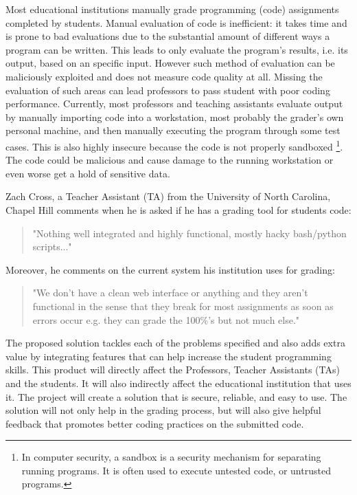 
Most educational institutions manually grade programming (code) assignments
completed by students. Manual evaluation of code is inefficient: it takes time
and is prone to bad evaluations due to the substantial amount of different ways
a program can be written. This leads to only evaluate the program's results,
i.e. its output, based on an specific input. However such method of evaluation
can be maliciously exploited and does not measure code quality at all. Missing
the evaluation of such areas can lead professors to pass student with poor
coding performance. Currently, most professors and teaching assistants evaluate
output by manually importing code into a workstation, most probably the grader's
own personal machine, and then manually executing the program through some test
cases. This is also highly insecure because the code is not properly
sandboxed \footnote{In computer security, a sandbox is a security mechanism for
separating running programs. It is often used to execute untested code, or
untrusted programs.}. The code could be malicious and cause damage to the
running workstation or even worse get a hold of sensitive data.


Zach Cross, a Teacher Assistant (TA) from the University of North Carolina,
Chapel Hill comments when he is asked if he has a grading tool for students
code: \begin{quote} "Nothing well integrated and highly functional, mostly hacky
bash/python scripts..." \end{quote} Moreover, he comments on the current system
his institution uses for grading: \begin{quote} "We don't have a clean web
interface or anything and they aren't functional in the sense that they break
for most assignments as soon as errors occur e.g. they can grade the 100\%'s but
not much else." \end{quote}


The proposed solution tackles each of the problems specified and also adds extra
value by integrating features that can help increase the student programming
skills. This product will directly affect the Professors, Teacher Assistants
(TAs) and the students. It will also indirectly affect the educational
institution that uses it. The project will create a solution that is secure,
reliable, and easy to use. The solution will not only help in the grading
process, but will also give helpful feedback that promotes better coding
practices on the submitted code.
